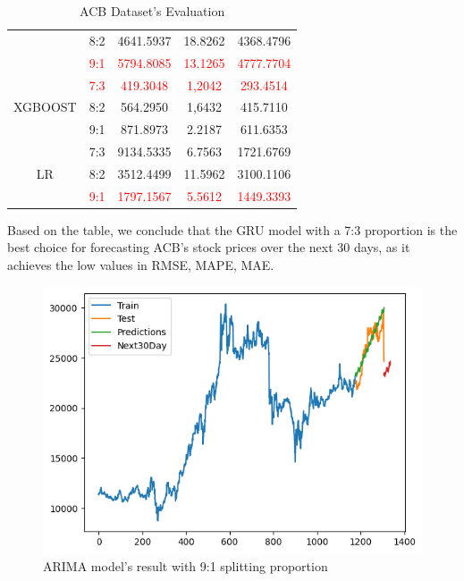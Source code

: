 \documentclass{ieeeojies}
\begin{document}
\begin{table}[H]
\begin{tabular}{|c|c|c|c|c|}
         & 8:2 & 4641.5937 & 18.8262 & 4368.4796 \\ 
         & \textcolor{red}{9:1}  & \textcolor{red}{5794.8085} & \textcolor{red}{13.1265} & \textcolor{red}{4777.7704} \\
         \hline
         \multirow{3}{*}{XGBOOST} 
         & \textcolor{red}{7:3}  & \textcolor{red}{419.3048} & \textcolor{red}{1,2042} & \textcolor{red}{293.4514} \\ 
         & 8:2 & 564.2950 & 1,6432 & 415.7110 \\ 
         & 9:1 & 871.8973 & 2.2187 & 611.6353 \\
         \hline
         \multirow{3}{*}{LR} 
         & 7:3 & 9134.5335 & 6.7563 & 1721.6769 \\ 
         & 8:2 & 3512.4499 & 11.5962 & 3100.1106 \\ 
         & \textcolor{red}{9:1}  & \textcolor{red}{1797.1567} & \textcolor{red}{5.5612} & \textcolor{red}{1449.3393} \\ 
         \hline
    \end{tabular}
    \caption{ACB Dataset's Evaluation}
    \label{vcbdataset}
\end{table}
Based on the table, we conclude that the GRU model with a 7:3 proportion is the best choice for forecasting ACB's stock prices over the next 30 days, as it achieves the low values in RMSE, MAPE, MAE.
\begin{figure}[H]
  \centering
  \begin{minipage}{0.6\linewidth}
    \centering
    \includegraphics[width=\linewidth]{bibliography/diagram/ARIMA-ACB.png}
    \caption{ARIMA model’s result with 9:1 splitting proportion}
    \label{fig8}
  \end{minipage}
\end{figure}
\end{document}

